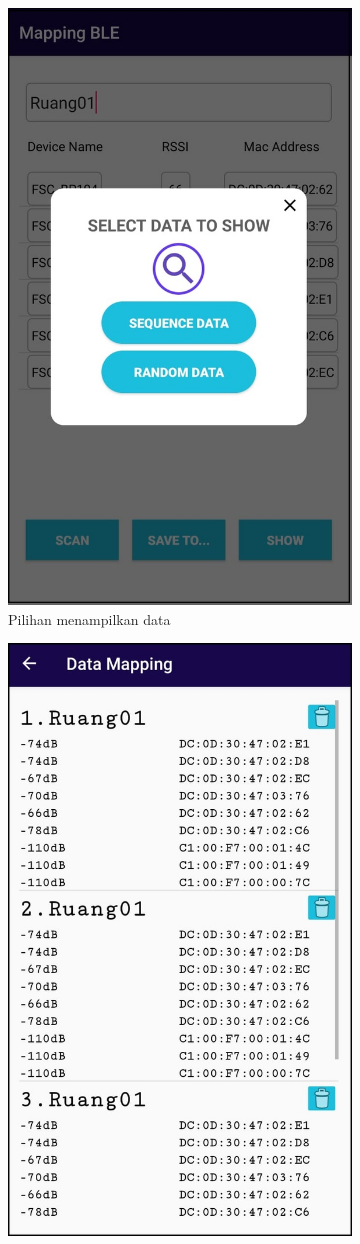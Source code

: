 \begin{enumerate}[a.]
\begin{enumerate}[a.]
\begin{figure} [H]
\begin{subfigure}{.5\textwidth}
			      \includegraphics[width=.5\linewidth]{gambar/android/mapping-show-data}
			      \caption{Pilihan menampilkan data}
		      \end{subfigure}
		      \vspace{1cm}
		      \newline
		      \begin{subfigure}{.5\textwidth}
			      \centering
			      \includegraphics[width=.5\linewidth]{gambar/android/mapping-data-list}

\end{subfigure}
\end{figure}
\end{enumerate}
\end{enumerate}
